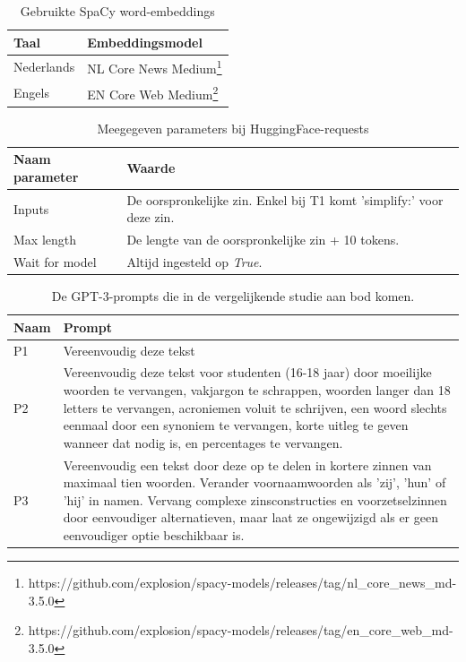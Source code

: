 \begin{center}
	\begin{table}[H]
		\begin{tabular}{ | m{7cm} | m{7cm} | } 
			\hline
			\textbf{Taal} & \textbf{Embeddingsmodel} \\
			\hline
			Nederlands & NL Core News Medium\footnote{https://github.com/explosion/spacy-models/releases/tag/nl_core_news_md-3.5.0} \\ 
			\hline
			Engels & EN Core Web Medium\footnote{https://github.com/explosion/spacy-models/releases/tag/en_core_web_md-3.5.0} \\
			\hline
		\end{tabular}
		\caption{Gebruikte SpaCy word-embeddings}
		\label{table:wordembeddings-spacy}
	\end{table}
\end{center}

\begin{center}
	\begin{table}[H]
		\begin{tabular}{ | m{6cm} | m{8cm} | } 
			\hline
			\textbf{Naam parameter} & \textbf{Waarde} \\
			\hline
			Inputs & De oorspronkelijke zin. Enkel bij T1 komt 'simplify:' voor deze zin. \\
			\hline
			Max length & De lengte van de oorspronkelijke zin + 10 tokens. \\
			\hline
			Wait for model & Altijd ingesteld op \textit{True}. \\
			\hline
		\end{tabular}
		\caption{Meegegeven parameters bij HuggingFace-requests}
		\label{table:huggingface-requests-parameters}
	\end{table}
\end{center}

\begin{center}
	\begin{table}[H]
		\begin{tabular}{ | m{2cm} | m{13cm} | } 
			\hline
			\textbf{Naam} & \textbf{Prompt} \\
			\hline
			P1 & Vereenvoudig deze tekst \\
			\hline
			P2 & Vereenvoudig deze tekst voor studenten (16-18 jaar) door moeilijke woorden te vervangen, vakjargon te schrappen, woorden langer dan 18 letters te vervangen, acroniemen voluit te schrijven, een woord slechts eenmaal door een synoniem te vervangen, korte uitleg te geven wanneer dat nodig is, en percentages te vervangen. \\
			\hline
			P3 & Vereenvoudig een tekst door deze op te delen in kortere zinnen van maximaal tien woorden. Verander voornaamwoorden als 'zij', 'hun' of 'hij' in namen. Vervang complexe zinsconstructies en voorzetselzinnen door eenvoudiger alternatieven, maar laat ze ongewijzigd als er geen eenvoudiger optie beschikbaar is. \\
			\hline
		\end{tabular}
		\caption{De GPT-3-prompts die in de vergelijkende studie aan bod komen.}
		\label{table:tested-prompts}
	\end{table}
\end{center}

